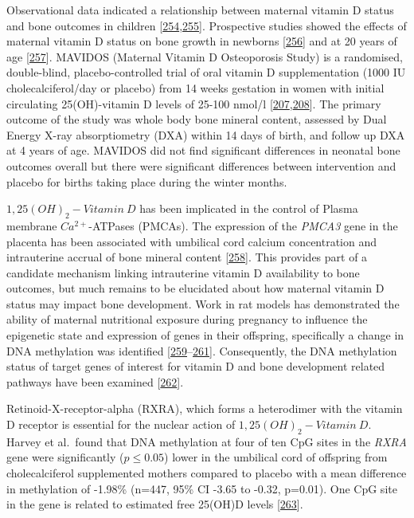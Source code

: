 \documentclass[
]{book}
\begin{document}
Observational data indicated a relationship between maternal vitamin D status and bone outcomes in children
{[}\protect\hyperlink{ref-Mahon2010a}{254},\protect\hyperlink{ref-Viljakainen2010}{255}{]}.
Prospective studies showed the effects of maternal vitamin D status on bone growth in newborns {[}\protect\hyperlink{ref-Viljakainen2011}{256}{]} and at 20 years of age {[}\protect\hyperlink{ref-Zhu2014a}{257}{]}.
MAVIDOS (Maternal Vitamin D Osteoporosis Study) is a randomised, double-blind, placebo-controlled trial of oral vitamin D supplementation (1000 IU cholecalciferol/day or placebo) from 14 weeks gestation in women with initial circulating 25(OH)-vitamin D levels of 25-100 nmol/l {[}\protect\hyperlink{ref-Harvey2012a}{207},\protect\hyperlink{ref-Cooper2016}{208}{]}.
The primary outcome of the study was whole body bone mineral content, assessed by Dual Energy X-ray absorptiometry (DXA) within 14 days of birth, and follow up DXA at 4 years of age.
MAVIDOS did not find significant differences in neonatal bone outcomes overall but there were significant differences between intervention and placebo for births taking place during the winter months.

\(1,25(OH)_2-Vitamin~D\) has been implicated in the control of Plasma membrane \(Ca^{2+}\)-ATPases (PMCAs).
The expression of the \emph{PMCA3} gene in the placenta has been associated with umbilical cord calcium concentration and intrauterine accrual of bone mineral content {[}\protect\hyperlink{ref-Kip2004}{258}{]}.
This provides part of a candidate mechanism linking intrauterine vitamin D availability to bone outcomes, but much remains to be elucidated about how maternal vitamin D status may impact bone development.
Work in rat models has demonstrated the ability of maternal nutritional exposure during pregnancy to influence the epigenetic state and expression of genes in their offspring, specifically a change in DNA methylation was identified {[}\protect\hyperlink{ref-Burdge2007a}{259}--\protect\hyperlink{ref-Burdge2007}{261}{]}.
Consequently, the DNA methylation status of target genes of interest for vitamin D and bone development related pathways have been examined {[}\protect\hyperlink{ref-Holroyd2012}{262}{]}.

Retinoid-X-receptor-alpha (RXRA), which forms a heterodimer with the vitamin D receptor is essential for the nuclear action of \(1,25(OH)_2-Vitamin~D\).
Harvey et al.~found that DNA methylation at four of ten CpG sites in the \emph{RXRA} gene were significantly (\(p\le0.05\)) lower in the umbilical cord of offspring from cholecalciferol supplemented mothers compared to placebo with a mean difference in methylation of -1.98\% (n=447, 95\% CI -3.65 to -0.32, p=0.01).
One CpG site in the gene is related to estimated free 25(OH)D levels {[}\protect\hyperlink{ref-Harvey2014d}{263}{]}.
\end{document}
